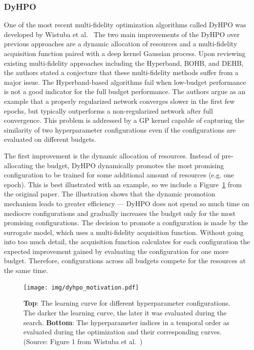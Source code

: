 \subsubsection{DyHPO}
One of the most recent multi-fidelity optimization algorithms called DyHPO was developed by Wistuba et al.~\cite{wistuba2022supervising} The two main improvements of the DyHPO over previous approaches are a dynamic allocation of resources and a multi-fidelity acquisition function paired with a deep kernel Gaussian process. Upon reviewing existing multi-fidelity approaches including the Hyperband, BOHB, and DEHB, the authors stated a conjecture that these multi-fidelity methods suffer from a major issue. The Hyperband-based algorithms fail when low-budget performance is not a good indicator for the full budget performance. The authors argue as an example that a properly regularized network converges slower in the first few epochs, but typically outperforms a non-regularized network after full convergence. This problem is addressed by a GP kernel capable of capturing the similarity of two hyperparameter configurations even if the configurations are evaluated on different budgets.

The first improvement is the dynamic allocation of resources. Instead of pre-allocating the budget, DyHPO dynamically promotes the most promising configuration to be trained for some additional amount of resources (e.g. one epoch). This is best illustrated with an example, so we include a Figure~\ref{fig:dyhpo_motivation} from the original paper. The illustration shows that the dynamic promotion mechanism leads to greater efficiency --- DyHPO does not spend so much time on mediocre configurations and gradually increases the budget only for the most promising configurations. The decision to promote a configuration is made by the surrogate model, which uses a multi-fidelity acquisition function. Without going into too much detail, the acquisition function calculates for each configuration the expected improvement gained by evaluating the configuration for one more budget. Therefore, configurations across all budgets compete for the resources at the same time.

\begin{figure}
    \centering
    \texttt{[image: img/dyhpo\_motivation.pdf]}
    \caption{\textbf{Top}: The learning curve for different hyperparameter configurations. The darker the learning curve, the later it was evaluated during the search. \textbf{Bottom}: The hyperparameter indices in a temporal order as evaluated during the optimization and their corresponding curves. (Source: Figure 1 from Wistuba et al.~\cite{wistuba2022supervising})}
    \label{fig:dyhpo_motivation}
\end{figure}

